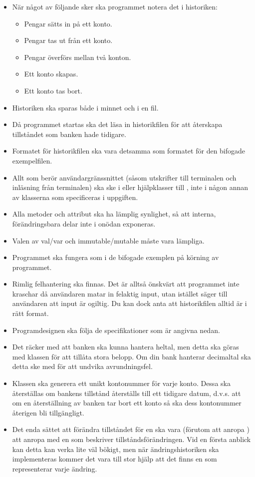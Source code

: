 \begin{itemize}
\item När något av följande sker ska programmet notera det i historiken:
\begin{itemize}
\item Pengar sätts in på ett konto.
\item Pengar tas ut från ett konto.
\item Pengar överförs mellan två konton.
\item Ett konto skapas.
\item Ett konto tas bort.
\end{itemize}
\item Historiken ska sparas både i minnet och i en fil.
\item Då programmet startas ska det läsa in historikfilen för att återskapa tillståndet som banken hade tidigare.
\item Formatet för historikfilen ska vara detsamma som formatet för den bifogade exempelfilen.
\item Allt som berör användargränssnittet (såsom utskrifter till terminalen och inläsning från terminalen) ska ske i  eller hjälpklasser till , inte i någon annan av klasserna som specificeras i uppgiften.
\item Alla metoder och attribut ska ha lämplig synlighet, så att interna, förändringsbara delar inte i onödan exponeras.
\item Valen av val/var och immutable/mutable måste vara lämpliga.
\item Programmet ska fungera som i de bifogade exemplen på körning av programmet.
\item Rimlig felhantering ska finnas. Det är alltså önskvärt att programmet inte kraschar då användaren matar in felaktig input, utan istället säger till användaren att input är ogiltig. Du kan dock anta att historikfilen alltid är i rätt format.
\item Programdesignen ska följa de specifikationer som är angivna nedan.
\item Det räcker med att banken ska kunna hantera heltal, men detta ska göras med klassen  för att tillåta stora belopp. Om din bank hanterar decimaltal ska detta ske med  för att undvika avrundningsfel.
\item Klassen  ska generera ett unikt kontonummer för varje konto. Dessa ska återställas om bankens tillstånd återställs till ett tidigare datum, d.v.s. att om en återställning av banken tar bort ett konto så ska dess kontonummer återigen bli tillgängligt.
\item Det enda sättet att förändra tillståndet för en  ska vara (förutom att anropa ) att anropa  med en  som beskriver tillståndsförändringen. Vid en första anblick kan detta kan verka lite väl bökigt, men när ändringshistoriken ska implementeras kommer det vara till stor hjälp att det finns en  som representerar varje ändring.
\end{itemize}

